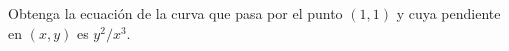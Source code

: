 \item Obtenga la ecuación de la curva que pasa por el punto $(1, 1)$ y cuya pendiente en $(x, y)$ es $y^2 / x^3$.
